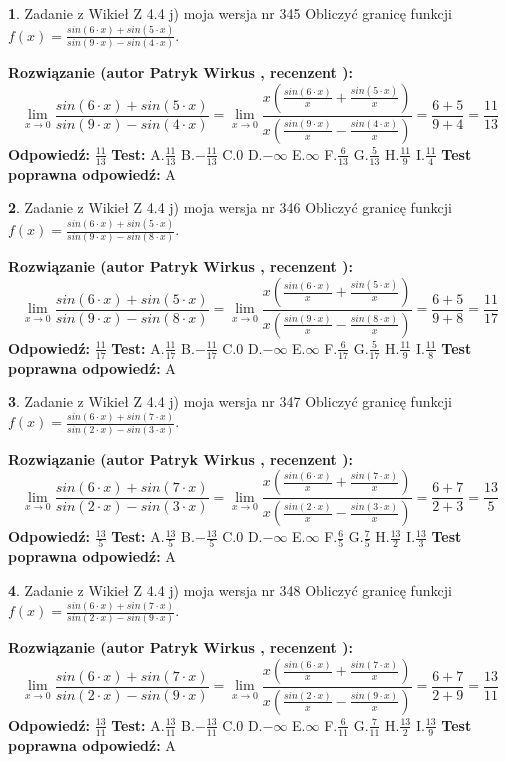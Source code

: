 \documentclass[12pt, a4paper]{article}
\theoremstyle{definition} %
\newtheorem{zad}{}
\newcommand{\zadStart}[1]{\begin{zad}#1\newline}
\newcommand{\zadStop}{\end{zad}}
\newcommand{\rozwStart}[2]{\noindent \textbf{Rozwiązanie (autor #1 , recenzent #2): }\newline}
\newcommand{\rozwStop}{\newline}
\newcommand{\odpStart}{\noindent \textbf{Odpowiedź:}\newline}
\newcommand{\odpStop}{\newline}
\newcommand{\testStart}{\noindent \textbf{Test:}\newline}
\newcommand{\testStop}{\newline}
\newcommand{\kluczStart}{\noindent \textbf{Test poprawna odpowiedź:}\newline}
\newcommand{\kluczStop}{\newline}
\begin{document}
\zadStart{Zadanie z Wikieł Z 4.4 j) moja wersja nr 345}
Obliczyć granicę funkcji $f(x)=\frac{sin(6\cdot x) +sin(5\cdot x)}{sin(9\cdot x) -sin(4\cdot x)}$.
\zadStop
\rozwStart{Patryk Wirkus}{}
$$\lim\limits_{x\to 0}\frac{sin(6\cdot x) +sin(5\cdot x)}{sin(9\cdot x) -sin(4\cdot x)}=\lim\limits_{x\to 0}\frac{x(\frac{sin(6\cdot x)}{x}+\frac{sin(5\cdot x)}{x})}{x(\frac{sin(9\cdot x)}{x}-\frac{sin(4\cdot x)}{x})}=\frac{6+5}{9+4} = \frac{11}{13}$$
\rozwStop
\odpStart
$\frac{11}{13}$
\odpStop
\testStart
A.$\frac{11}{13}$
B.$-\frac{11}{13}$
C.$0$
D.$-\infty$
E.$\infty$
F.$\frac{6}{13}$
G.$\frac{5}{13}$
H.$\frac{11}{9}$
I.$\frac{11}{4}$
\testStop
\kluczStart
A
\kluczStop



\zadStart{Zadanie z Wikieł Z 4.4 j) moja wersja nr 346}
Obliczyć granicę funkcji $f(x)=\frac{sin(6\cdot x) +sin(5\cdot x)}{sin(9\cdot x) -sin(8\cdot x)}$.
\zadStop
\rozwStart{Patryk Wirkus}{}
$$\lim\limits_{x\to 0}\frac{sin(6\cdot x) +sin(5\cdot x)}{sin(9\cdot x) -sin(8\cdot x)}=\lim\limits_{x\to 0}\frac{x(\frac{sin(6\cdot x)}{x}+\frac{sin(5\cdot x)}{x})}{x(\frac{sin(9\cdot x)}{x}-\frac{sin(8\cdot x)}{x})}=\frac{6+5}{9+8} = \frac{11}{17}$$
\rozwStop
\odpStart
$\frac{11}{17}$
\odpStop
\testStart
A.$\frac{11}{17}$
B.$-\frac{11}{17}$
C.$0$
D.$-\infty$
E.$\infty$
F.$\frac{6}{17}$
G.$\frac{5}{17}$
H.$\frac{11}{9}$
I.$\frac{11}{8}$
\testStop
\kluczStart
A
\kluczStop



\zadStart{Zadanie z Wikieł Z 4.4 j) moja wersja nr 347}
Obliczyć granicę funkcji $f(x)=\frac{sin(6\cdot x) +sin(7\cdot x)}{sin(2\cdot x) -sin(3\cdot x)}$.
\zadStop
\rozwStart{Patryk Wirkus}{}
$$\lim\limits_{x\to 0}\frac{sin(6\cdot x) +sin(7\cdot x)}{sin(2\cdot x) -sin(3\cdot x)}=\lim\limits_{x\to 0}\frac{x(\frac{sin(6\cdot x)}{x}+\frac{sin(7\cdot x)}{x})}{x(\frac{sin(2\cdot x)}{x}-\frac{sin(3\cdot x)}{x})}=\frac{6+7}{2+3} = \frac{13}{5}$$
\rozwStop
\odpStart
$\frac{13}{5}$
\odpStop
\testStart
A.$\frac{13}{5}$
B.$-\frac{13}{5}$
C.$0$
D.$-\infty$
E.$\infty$
F.$\frac{6}{5}$
G.$\frac{7}{5}$
H.$\frac{13}{2}$
I.$\frac{13}{3}$
\testStop
\kluczStart
A
\kluczStop



\zadStart{Zadanie z Wikieł Z 4.4 j) moja wersja nr 348}
Obliczyć granicę funkcji $f(x)=\frac{sin(6\cdot x) +sin(7\cdot x)}{sin(2\cdot x) -sin(9\cdot x)}$.
\zadStop
\rozwStart{Patryk Wirkus}{}
$$\lim\limits_{x\to 0}\frac{sin(6\cdot x) +sin(7\cdot x)}{sin(2\cdot x) -sin(9\cdot x)}=\lim\limits_{x\to 0}\frac{x(\frac{sin(6\cdot x)}{x}+\frac{sin(7\cdot x)}{x})}{x(\frac{sin(2\cdot x)}{x}-\frac{sin(9\cdot x)}{x})}=\frac{6+7}{2+9} = \frac{13}{11}$$
\rozwStop
\odpStart
$\frac{13}{11}$
\odpStop
\testStart
A.$\frac{13}{11}$
B.$-\frac{13}{11}$
C.$0$
D.$-\infty$
E.$\infty$
F.$\frac{6}{11}$
G.$\frac{7}{11}$
H.$\frac{13}{2}$
I.$\frac{13}{9}$
\testStop
\kluczStart
A
\kluczStop
\end{document}
